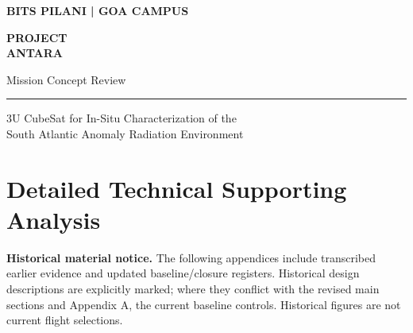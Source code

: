 \documentclass[11pt,a4paper]{article}
\begin{document}
\hypersetup{pageanchor=false}
\begin{titlepage}
\thispagestyle{empty}
\vspace*{17mm}
{\sffamily\bfseries\color{AntaraTeal}\large BITS PILANI | GOA CAMPUS\par}
\vspace{34mm}
{\sffamily\bfseries\color{AntaraNavy}\fontsize{35}{40}\selectfont PROJECT\\[2mm] ANTARA\par}
\vspace{11mm}
{\sffamily\Large Mission Concept Review\par}
\vspace{8mm}
\noindent\color{AntaraTeal}\rule{0.85\textwidth}{1.6pt}\par\color{black}
\vspace{14mm}
{\large 3U CubeSat for In-Situ Characterization of the\\South Atlantic Anomaly Radiation Environment\par}
\vfill
\end{titlepage}
\hypersetup{pageanchor=true}
\tableofcontents
\clearpage
\listoftables
\listoffigures
\clearpage
{}

\clearpage

\clearpage

\clearpage

\clearpage



\clearpage
\appendix

\section{Detailed Technical Supporting Analysis}
\label{app:technical-support}

\clearpage

\clearpage

\clearpage

\clearpage

\clearpage


\clearpage
\noindent\textbf{Historical material notice.} The following appendices include transcribed earlier evidence and updated baseline/closure registers. Historical design descriptions are explicitly marked; where they conflict with the revised main sections and Appendix A, the current baseline controls. Historical figures are not current flight selections.

\clearpage

\clearpage

\clearpage

\clearpage

\clearpage

\clearpage

\end{document}
